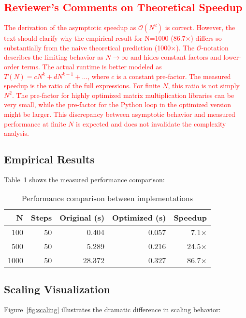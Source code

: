 \documentclass[11pt,a4paper]{article}
\newcommand{\bigO}{\mathcal{O}}
\begin{document}
\textcolor{red}{
\subsection*{Reviewer's Comments on Theoretical Speedup}
The derivation of the asymptotic speedup as $\bigO(N^2)$ is correct. However, the text should clarify why the empirical result for N=1000 (86.7×) differs so substantially from the naive theoretical prediction (1000×). The $\bigO$-notation describes the limiting behavior as $N \to \infty$ and hides constant factors and lower-order terms. The actual runtime is better modeled as $T(N) = cN^k + dN^{k-1} + \ldots$, where $c$ is a constant pre-factor. The measured speedup is the ratio of the full expressions. For finite $N$, this ratio is not simply $N^2$. The pre-factor for highly optimized matrix multiplication libraries can be very small, while the pre-factor for the Python loop in the optimized version might be larger. This discrepancy between asymptotic behavior and measured performance at finite $N$ is expected and does not invalidate the complexity analysis.
}

\subsection{Empirical Results}

Table~\ref{tab:performance_comparison} shows the measured performance comparison:

\begin{table}[H]
\centering
\begin{tabular}{@{}rrrrr@{}}
\toprule
N & Steps & Original (s) & Optimized (s) & Speedup \\
\midrule
100 & 50 & 0.404 & 0.057 & 7.1× \\
500 & 50 & 5.289 & 0.216 & 24.5× \\
1000 & 50 & 28.372 & 0.327 & 86.7× \\
\bottomrule
\end{tabular}
\caption{Performance comparison between implementations}
\label{tab:performance_comparison}
\end{table}

\subsection{Scaling Visualization}

Figure~\ref{fig:scaling} illustrates the dramatic difference in scaling behavior:
\end{document}
